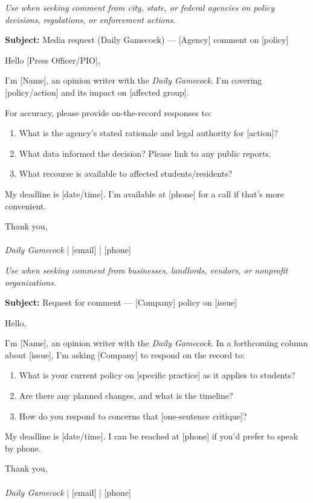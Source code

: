 \documentclass[12pt]{article}
\begin{document}
\begin{templatebox}
\emph{Use when seeking comment from city, state, or federal agencies on policy decisions, regulations, or enforcement actions.}

\textbf{Subject:} Media request (Daily Gamecock) --- [Agency] comment on [policy]

Hello [Press Officer/PIO],

I'm [Name], an opinion writer with the \emph{Daily Gamecock}. I'm covering [policy/action] and its impact on [affected group].

For accuracy, please provide on-the-record responses to:

\begin{enumerate}[label=\arabic*.]
  \item What is the agency's stated rationale and legal authority for [action]?
  \item What data informed the decision? Please link to any public reports.
  \item What recourse is available to affected students/residents?
\end{enumerate}

My deadline is [date/time]. I'm available at [phone] for a call if that's more convenient.

Thank you,\\
[Name]\\
\emph{Daily Gamecock} | [email] | [phone]
\end{templatebox}

\begin{templatebox}
\emph{Use when seeking comment from businesses, landlords, vendors, or nonprofit organizations.}

\textbf{Subject:} Request for comment --- [Company] policy on [issue]

Hello,

I'm [Name], an opinion writer with the \emph{Daily Gamecock}. In a forthcoming column about [issue], I'm asking [Company] to respond on the record to:

\begin{enumerate}[label=\arabic*.]
  \item What is your current policy on [specific practice] as it applies to students?
  \item Are there any planned changes, and what is the timeline?
  \item How do you respond to concerns that [one-sentence critique]?
\end{enumerate}

My deadline is [date/time]. I can be reached at [phone] if you'd prefer to speak by phone.

Thank you,\\
[Name]\\
\emph{Daily Gamecock} | [email] | [phone]
\end{templatebox}
\end{document}
